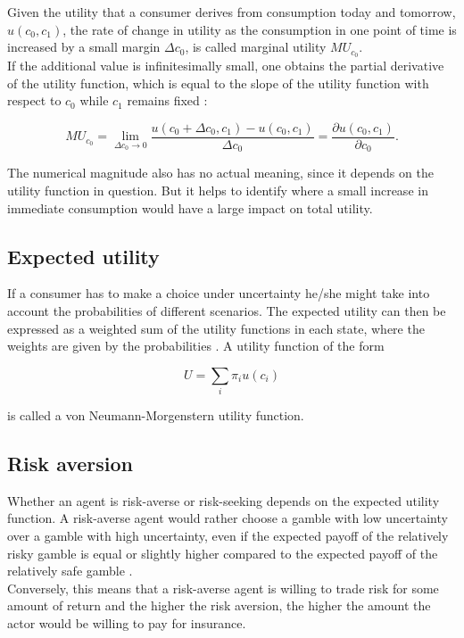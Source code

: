 \noindent Given the utility that a consumer derives from consumption today and tomorrow, $u(c_0, c_1)$, the rate of change in utility as the consumption in one point of time is increased by a small margin $\Delta c_0$, is called marginal utility $MU_{c_0}$.\\
If the additional value is infinitesimally small, one obtains the partial derivative of the utility function, which is equal to the slope of the utility function with respect to $c_0$ while $c_1$ remains fixed \citep[p. 70]{varian2010intermediate}:

\begin{equation}
    MU_{c_0} = \lim_{\Delta c_0 \to 0} \frac{u(c_0 + \Delta c_0, c_1) - u(c_0, c_1)}{\Delta c_0} = \frac{\partial u(c_0, c_1)}{\partial c_0}.
\end{equation}

\bigskip

\noindent The numerical magnitude also has no actual meaning, since it depends on the utility function in question. But it helps to identify where a small increase in immediate consumption would have a large impact on total utility.

\bigskip

\subsection{Expected utility}

If a consumer has to make a choice under uncertainty he/she might take into account the probabilities of different scenarios. The expected utility can then be expressed as a weighted sum of the utility functions in each state, where the weights are given by the probabilities \citep[p. 223]{varian2010intermediate}. A utility function of the form 

\begin{equation}
    U=\sum_i \pi_i u(c_i)
\end{equation}

\bigskip

\noindent is called a von Neumann-Morgenstern utility function.

\bigskip


\subsection{Risk aversion}

Whether an agent is risk-averse or risk-seeking depends on the expected utility function. A risk-averse agent would rather choose a gamble with low uncertainty over a gamble with high uncertainty, even if the expected payoff of the relatively risky gamble is equal or slightly higher compared to the expected payoff of the relatively safe gamble \citep[p. 104]{arrow1996risk}.\\
Conversely, this means that a risk-averse agent is willing to trade risk for some amount of return \citep[p. 122]{pratt1964risk} and the higher the risk aversion, the higher the amount the actor would be willing to pay for insurance.\\

